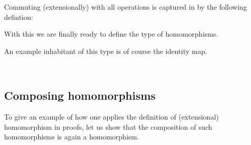 \documentclass[a4paper,USenglish,cleveref,autoref,thm-restate]{lipics-v2019}
\begin{document}
Commuting (extensionally) with all operations is captured in \agda by the following defintion:
\begin{code}\end{code}
With this we are finally ready to define the type of homomorphisms.
\begin{code}\end{code}
An example inhabitant of this type is of course the identity map.
\begin{code}
\>[0]\AgdaSpace{}%
\AgdaSymbol{:}%
\>[6]\AgdaSymbol{(}\AgdaSpace{}%
\AgdaSymbol{:}\AgdaSpace{}%
\AgdaSpace{}%
\AgdaSpace{}%
\AgdaSymbol{)}\AgdaSpace{}%
\AgdaSpace{}%
\AgdaSpace{}%
\AgdaSpace{}%
\<%
\\
\>[0]\AgdaSpace{}%
\AgdaSymbol{\AgdaUnderscore{}}\AgdaSpace{}%
\AgdaSymbol{=}\AgdaSpace{}%
\AgdaSpace{}%
\AgdaSpace{}%
\AgdaSpace{}%
\AgdaSymbol{)}\AgdaSpace{}%
\AgdaOperator{\AgdaInductiveConstructor{,}}\AgdaSpace{}%
\AgdaSpace{}%
\AgdaBound{\AgdaUnderscore{}}\AgdaSpace{}%
\AgdaBound{\AgdaUnderscore{}}\AgdaSpace{}%
\AgdaSpace{}%
\<%
\end{code}
\subsection{Composing homomorphisms}
To give an example of how one applies the definition of (extensional) homomorphism in proofs, let us show that the composition of such homomorphisms is again a homomorphism.
\begin{code}\end{code}
\end{document}
